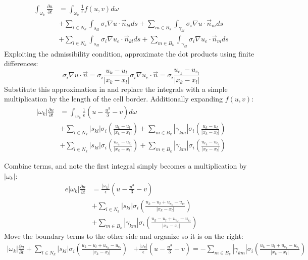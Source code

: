 \documentclass{finalproject}
\begin{document}
\begin{align*}
    \int_{\omega_k}\frac{\partial u}{\partial t} &=\int_{\omega_k}\frac{1}{\epsilon}f(u,v)d\omega \\ 
    &+ \sum_{l \in N_k}\int_{s_{kl}} \sigma_i \nabla u \cdot \overrightarrow{n}_{kl}ds +
    \sum_{m \in B_k}\int_{\gamma_{kl}} \sigma_i \nabla u \cdot \overrightarrow{n}_{m}ds \\
    &+ \sum_{l \in N_k}\int_{s_{kl}} \sigma_i \nabla u_e \cdot \overrightarrow{n}_{kl}ds +
    \sum_{m \in B_k}\int_{\gamma_{kl}} \sigma_i \nabla u_e \cdot \overrightarrow{n}_{m}ds
\end{align*}
Exploiting the admissibility condition, approximate the dot products using finite differences:
\begin{equation}
    \sigma_i \nabla u \cdot \overrightarrow{n} = \sigma_i \frac{u_k - u_l}{|x_k - x_l|}
    \sigma_i \nabla u_e \cdot \overrightarrow{n} = \sigma_i \frac{u_{e_k} - u_{e_l}}{|x_k - x_l|}
\end{equation}
Substitute this approximation in and replace the integrals with a simple multiplication by the length of the cell border. Additionally expanding $f(u,v)$:
\begin{align*}
|\omega_k|\frac{\partial u}{\partial t} &= \int_{w_k}\frac{1}{\epsilon}(u - \frac{u^3}{3} - v)d\omega\\
&+ \sum_{l \in N_k} |s_{kl}| \sigma_i ( \frac{u_k - u_l}{|x_k - x_l|} ) + 
\sum_{m \in B_k} |\gamma_{km}| \sigma_i ( \frac{u_k - u_l}{|x_k - x_l|} )  \\
&+ \sum_{l \in N_k} |s_{kl}| \sigma_i ( \frac{u_{e_k} - u_{e_l}}{|x_k - x_l|} ) + 
\sum_{m \in B_k} |\gamma_{km}| \sigma_i ( \frac{u_{e_k} - u_{e_l}}{|x_k - x_l|} ) 
\end{align*}

Combine terms, and note the first integral simply becomes a multiplication by $|\omega_k|$:
\begin{align*}e
|\omega_k|\frac{\partial u}{\partial t} &= \frac{|\omega_k|}{\epsilon}(u - \frac{u^3}{3} - v)\\
&+ \sum_{l \in N_k} |s_{kl}| \sigma_i ( \frac{u_k - u_l + u_{e_k} - u_{e_l}}{|x_k - x_l|} ) \\
&+ \sum_{m \in B_k} |\gamma_{km}| \sigma_i ( \frac{u_k - u_l + u_{e_k} - u_{e_l}}{|x_k - x_l|} ) 
\end{align*}
Move the boundary terms to the other side and organize so it is on the right:
\begin{align*}
|\omega_k|\frac{\partial u}{\partial t} + \sum_{l \in N_k} |s_{kl}| \sigma_i ( \frac{u_k - u_l + u_{e_k} - u_{e_l}}{|x_k - x_l|} )
&+ \frac{|\omega_k|}{\epsilon}(u - \frac{u^3}{3} - v)
= -\sum_{m \in B_k} |\gamma_{km}| \sigma_i ( \frac{u_k - u_l + u_{e_k} - u_{e_l}}{|x_k - x_l|} ) 
\end{align*}
\end{document}
